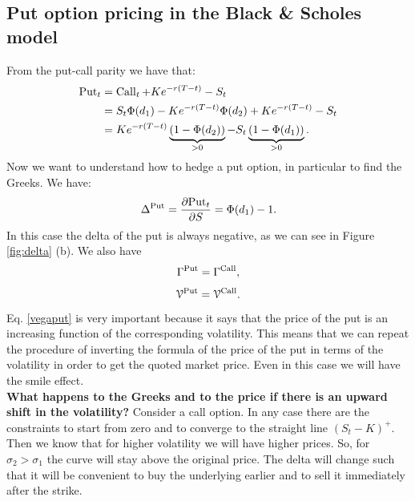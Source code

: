 \subsection{Put option pricing in the Black \& Scholes model}
From the put-call parity we have that:
\begin{align}
    \notag \text{Put}_t &= \operatorname{Call}_t + Ke^{-r(T-t)} - S_t \\
    &=
    \notag S_t\Phi(d_1) - Ke^{-r(T-t)}\Phi(d_2) + Ke^{-r(T-t)} - S_t \\
    &=
    Ke^{-r(T-t)}\underbrace{(1-\Phi(d_2))}_{>0} - S_t\underbrace{(1-\Phi(d_1))}_{>0}.
\end{align}
Now we want to understand how to hedge a put option, in particular to find the Greeks. We have:
\begin{equation}
    \Delta^{\text{Put}} = \pdv{\text{Put}_t}{S} = \Phi(d_1)-1.
\end{equation}
In this case the delta of the put is always negative, as we can see in Figure \ref{fig:delta} (b). We also have
\begin{equation}
    \Gamma^{\text{Put}} = \Gamma^{\operatorname{Call}},
\end{equation}
\begin{equation}\label{vegaput}
    \mathcal{V}^{\text{Put}} = \mathcal{V}^{\operatorname{Call}}.
\end{equation}
Eq. \eqref{vegaput} is very important because it says that the price of the put is an increasing function of the corresponding volatility. This means that we can repeat the procedure of inverting the formula of the price of the put in terms of the volatility in order to get the quoted market price. Even in this case we will have the smile effect.\\
\textbf{What happens to the Greeks and to the price if there is an upward shift in the volatility?} Consider a call option. In any case there are the constraints to start from zero and to converge to the straight line $(S_t-K)^+$. Then we know that for higher volatility we will have higher prices. So, for $\sigma_2>\sigma_1$ the curve will stay above the original price.
The delta will change such that it will be convenient to buy the underlying earlier and to sell it immediately after the strike.
